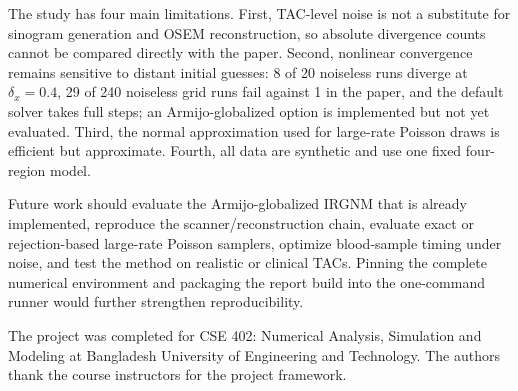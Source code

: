 \documentclass[sigconf,nonacm]{acmart}
\begin{document}
The study has four main limitations. First, TAC-level noise is not a substitute for sinogram generation and OSEM reconstruction, so absolute divergence counts cannot be compared directly with the paper. Second, nonlinear convergence remains sensitive to distant initial guesses: 8 of 20 noiseless runs diverge at $\delta_x=0.4$, 29 of 240 noiseless grid runs fail against 1 in the paper, and the default solver takes full steps; an Armijo-globalized option is implemented but not yet evaluated. Third, the normal approximation used for large-rate Poisson draws is efficient but approximate. Fourth, all data are synthetic and use one fixed four-region model.

Future work should evaluate the Armijo-globalized IRGNM that is already implemented, reproduce the scanner/reconstruction chain, evaluate exact or rejection-based large-rate Poisson samplers, optimize blood-sample timing under noise, and test the method on realistic or clinical TACs. Pinning the complete numerical environment and packaging the report build into the one-command runner would further strengthen reproducibility.

\begin{acks}
The project was completed for CSE 402: Numerical Analysis, Simulation and Modeling at Bangladesh University of Engineering and Technology. The authors thank the course instructors for the project framework.
\end{acks}



\end{document}
